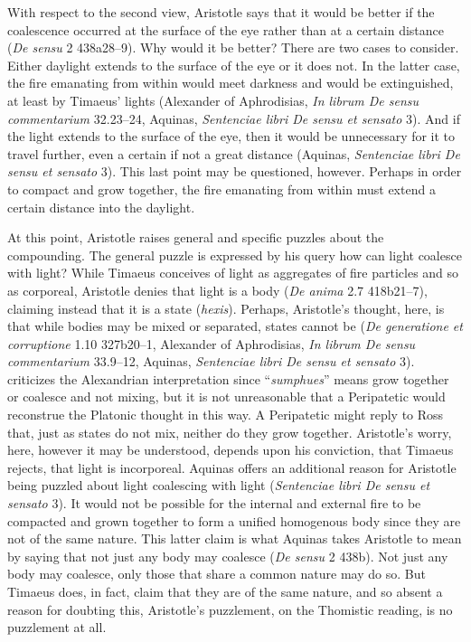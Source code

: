 With respect to the second view, Aristotle says that it would be better if the coalescence occurred at the surface of the eye rather than at a certain distance (\emph{De sensu} 2 438a28--9). Why would it be better? There are two cases to consider. Either daylight extends to the surface of the eye or it does not. In the latter case, the fire emanating from within would meet darkness and would be extinguished, at least by Timaeus' lights (Alexander of Aphrodisias, \emph{In librum De sensu commentarium} 32.23--24, Aquinas, \emph{Sentenciae libri De sensu et sensato} 3). And if the light extends to the surface of the eye, then it would be unnecessary for it to travel further, even a certain if not a great distance (Aquinas, \emph{Sentenciae libri De sensu et sensato} 3). This last point may be questioned, however. Perhaps in order to compact and grow together, the fire emanating from within must extend a certain distance into the daylight.

At this point, Aristotle raises general and specific puzzles about the compounding. The general puzzle is expressed by his query how can light coalesce with light? While Timaeus conceives of light as aggregates of fire particles and so as corporeal, Aristotle denies that light is a body (\emph{De anima} 2.7 418b21--7), claiming instead that it is a state (\emph{hexis}). Perhaps, Aristotle's thought, here, is that while bodies may be mixed or separated, states cannot be (\emph{De generatione et corruptione} 1.10 327b20--1, Alexander of Aphrodisias, \emph{In librum De sensu commentarium} 33.9--12, Aquinas, \emph{Sentenciae libri De sensu et sensato} 3). \citet[140--1]{Ross:1906xi} criticizes the Alexandrian interpretation since ``\emph{sumphues}'' means grow together or coalesce and not mixing, but it is not unreasonable that a Peripatetic would reconstrue the Platonic thought in this way. A Peripatetic might reply to Ross that, just as states do not mix, neither do they grow together. Aristotle's worry, here, however it may be understood, depends upon his conviction, that Timaeus rejects, that light is incorporeal. Aquinas offers an additional reason for Aristotle being puzzled about light coalescing with light (\emph{Sentenciae libri De sensu et sensato} 3). It would not be possible for the internal and external fire to be compacted and grown together to form a unified homogenous body since they are not of the same nature. This latter claim is what Aquinas takes Aristotle to mean by saying that not just any body may coalesce (\emph{De sensu} 2 438b). Not just any body may coalesce, only those that share a common nature may do so. But Timaeus does, in fact, claim that they are of the same nature, and so absent a reason for doubting this, Aristotle's puzzlement, on the Thomistic reading, is no puzzlement at all. 

